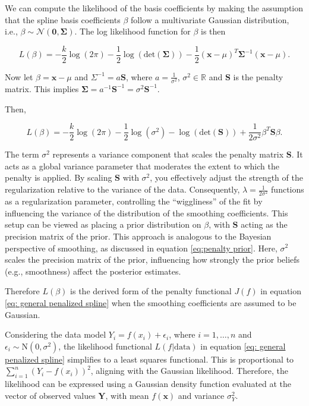 \documentclass[
11pt, %
oneside, %
english, %
singlespacing, %
]{macthesis} %
\begin{document}
We can compute the likelihood of the basis coefficients by making the assumption that
the spline basis coefficients \(\beta\) follow a multivariate Gaussian distribution, i.e., \(\beta \sim \mathcal{N}(\mathbf{0}, \mathbf{\Sigma})\). The log likelihood function for \(\beta\) is then

\[
L(\beta) = -\frac{k}{2} \log(2\pi) -\frac{1}{2} \log(\text{det}(\mathbf{\Sigma})) -\frac{1}{2} (\mathbf{x}-\mu)^T \mathbf{\Sigma}^{-1} (\mathbf{x}-\mu).
\]

Now let \(\beta = \mathbf{x}- \mu\) and \(\Sigma^{-1}= a\mathbf{S}\), where \(a = \frac{1}{\sigma^2}\), \(\sigma^2 \in \mathbb{R}\) and \(\mathbf{S}\) is the penalty matrix. This implies \(\mathbf{\Sigma} = a^{-1}\mathbf{S}^{-1}= \sigma^2\mathbf{S}^{-1}\).

Then,

\begin{equation}
L(\beta) = -\frac{k}{2} \log(2\pi) - \frac{1}{2} \log(\sigma^2) -  \log(\text{det}(\mathbf{S})) + \frac{1}{2\sigma^2} \beta^T \mathbf{S} \beta.
\label{eq:obj eqn}
\end{equation}

The term \(\sigma^2\) represents a variance component that scales the penalty matrix \(\mathbf{S}\). It acts as a global variance parameter that moderates the extent to which the penalty is applied. By scaling \(\mathbf{S}\) with \(\sigma^2\), you effectively adjust the strength of the regularization relative to the variance of the data. Consequently, \(\lambda = \frac{1}{2\sigma^2}\) functions as a regularization parameter, controlling the ``wiggliness'' of the fit by influencing the variance of the distribution of the smoothing coefficients. This setup can be viewed as placing a prior distribution on \(\beta\), with \(\mathbf{S}\) acting as the precision matrix of the prior. This approach is analogous to the Bayesian perspective of smoothing, as discussed in equation \ref{eq:penalty prior}. Here, \(\sigma^2\) scales the precision matrix of the prior, influencing how strongly the prior beliefs (e.g., smoothness) affect the posterior estimates.

Therefore \(L(\beta)\) is the derived form of the penalty functional \(J(f)\) in equation \ref{eq: general penalized spline} when the smoothing coefficients are assumed to be Gaussian.

Considering the data model \(Y_i = f(x_i) + \epsilon_i\), where \(i = 1, \dots, n\) and \(\epsilon_i \sim \text{N}(0, \sigma^2)\), the likelihood functional \(L(f|\text{data})\) in equation \ref{eq: general penalized spline} simplifies to a least squares functional. This is proportional to \(\sum_{i=1}^n (Y_i - f(x_i))^2\), aligning with the Gaussian likelihood. Therefore, the likelihood can be expressed using a Gaussian density function evaluated at the vector of observed values \(\mathbf{Y}\), with mean \(f(\mathbf{x})\) and variance \(\sigma^2_Y\).
\end{document}
